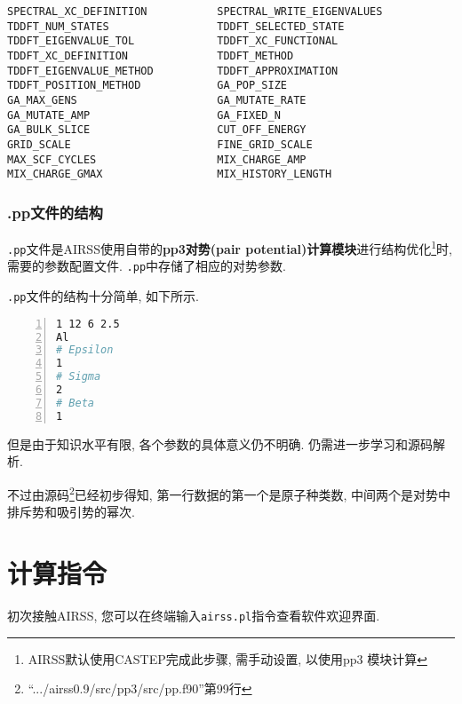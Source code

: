 \documentclass[a4paper, 10pt]{article}
\begin{document}
\begin{lstlisting}[numbers=right]
SPECTRAL_XC_DEFINITION           SPECTRAL_WRITE_EIGENVALUES      
TDDFT_NUM_STATES                 TDDFT_SELECTED_STATE            
TDDFT_EIGENVALUE_TOL             TDDFT_XC_FUNCTIONAL             
TDDFT_XC_DEFINITION              TDDFT_METHOD                    
TDDFT_EIGENVALUE_METHOD          TDDFT_APPROXIMATION             
TDDFT_POSITION_METHOD            GA_POP_SIZE                     
GA_MAX_GENS                      GA_MUTATE_RATE                  
GA_MUTATE_AMP                    GA_FIXED_N                      
GA_BULK_SLICE                    CUT_OFF_ENERGY                   
GRID_SCALE                       FINE_GRID_SCALE
MAX_SCF_CYCLES                   MIX_CHARGE_AMP 
MIX_CHARGE_GMAX                  MIX_HISTORY_LENGTH
        \end{lstlisting}


      \subsubsection{.pp文件的结构}
      \verb|.pp|文件是AIRSS使用自带的\textbf{pp3对势(pair potential)计算模块}进行结构优化\footnote{AIRSS默认使用CASTEP完成此步骤, 需手动设置, 以使用pp3
      模块计算}时, 需要的参数配置文件. \verb|.pp|中存储了相应的对势参数.

      \verb|.pp|文件的结构十分简单, 如下所示. 

      \begin{lstlisting}[language={bash},numbers=left]
1 12 6 2.5
Al
# Epsilon
1
# Sigma
2
# Beta
1
       \end{lstlisting}

       但是由于知识水平有限, 各个参数的具体意义仍不明确. 仍需进一步学习和源码解析. 

       不过由源码\footnote{``.../airss0.9/src/pp3/src/pp.f90''第99行}已经初步得知, 第一行数据的第一个是原子种类数, 中间两个是对势中排斥势和吸引势的幂次.

  \section{计算指令}
  初次接触AIRSS, 您可以在终端输入\verb|airss.pl|指令查看软件欢迎界面.
  
\end{document}
